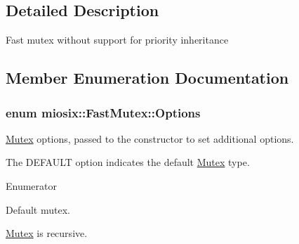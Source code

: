 \subsection{Detailed Description}
Fast mutex without support for priority inheritance 

\subsection{Member Enumeration Documentation}
\hypertarget{classmiosix_1_1_fast_mutex_a981dd8f3190f81f16a773b3de6ae0891}{
\subsubsection[{Options}]{\setlength{\rightskip}{0pt plus 5cm}enum {\bf miosix\-::\-Fast\-Mutex\-::\-Options}}}\label{classmiosix_1_1_fast_mutex_a981dd8f3190f81f16a773b3de6ae0891}
\hyperlink{classmiosix_1_1_mutex}{Mutex} options, passed to the constructor to set additional options.\par
 The D\-E\-F\-A\-U\-L\-T option indicates the default \hyperlink{classmiosix_1_1_mutex}{Mutex} type. \begin{Desc}
\item[Enumerator]\par
\begin{description}
\item[{\em 
\hypertarget{classmiosix_1_1_fast_mutex_a981dd8f3190f81f16a773b3de6ae0891a3e00b8e92574e595293459333b1e9182}{D\-E\-F\-A\-U\-L\-T}\label{classmiosix_1_1_fast_mutex_a981dd8f3190f81f16a773b3de6ae0891a3e00b8e92574e595293459333b1e9182}
}]Default mutex. \item[{\em 
\hypertarget{classmiosix_1_1_fast_mutex_a981dd8f3190f81f16a773b3de6ae0891aa70c27d1982ebadac457d4f1c45fa2c8}{R\-E\-C\-U\-R\-S\-I\-V\-E}\label{classmiosix_1_1_fast_mutex_a981dd8f3190f81f16a773b3de6ae0891aa70c27d1982ebadac457d4f1c45fa2c8}
}]\hyperlink{classmiosix_1_1_mutex}{Mutex} is recursive. \end{description}
\end{Desc}


